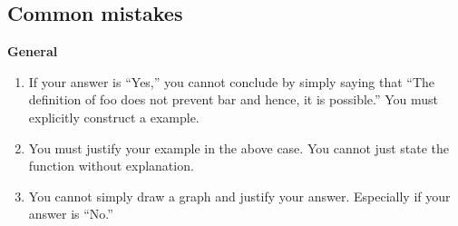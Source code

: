 \documentclass[12pt]{article}
\theoremstyle{definition}
\begin{document}
\subsection{Common mistakes}

\textbf{General}
\begin{enumerate}[label = \roman*.]
	\item If your answer is ``Yes,'' you cannot conclude by simply saying that ``The definition of {\color{red}foo} does not prevent {\color{blue}bar} and hence, it is possible.'' You must explicitly construct a example.
	\item You must justify your example in the above case. You cannot just state the function without explanation.
	\item You cannot simply draw a graph and justify your answer. Especially if your answer is ``No.''
\end{enumerate}
\end{document}
